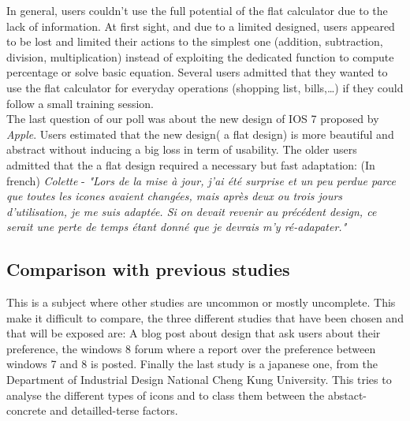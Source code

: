 \documentclass[a4paper,11pt] {article}
\theoremstyle{definition}
\begin{document}
    In general, users couldn't use the full potential of the flat calculator due to the lack of information. At first sight, and due to a limited designed, users appeared to be lost and limited their actions to the simplest one (addition, subtraction, division, multiplication) instead of exploiting the dedicated function to compute percentage or solve basic equation. Several users admitted that they wanted to use the flat calculator for everyday operations (shopping list, bills,\ldots) if they could follow a small training session.\\

    The last question of our poll was about the new design of IOS 7 proposed by \textit{Apple}.
    Users estimated that the new design( a flat design) is more beautiful and abstract without inducing a big loss in term of usability. The older users admitted that the a flat design required a necessary but fast adaptation:
  	(In french) \textit{Colette} - \textit{"Lors de la mise à jour, j'ai été surprise et un peu perdue parce que toutes les icones avaient changées, mais après deux ou trois jours d'utilisation, je me suis adaptée. Si on devait revenir au précédent design, ce serait une perte de temps étant donné que je devrais m'y ré-adapater."}

    \subsection{Comparison with previous studies}
    This is a subject where other studies are uncommon or mostly uncomplete. This make it difficult to compare, the three different studies that have been chosen and that will be exposed are: A blog post about design that ask users about their preference, the windows 8 forum where a report over the preference between windows 7 and 8 is posted. Finally the last study is a japanese one, from the Department of Industrial Design National Cheng Kung University. This tries to analyse the different types of icons and to class them between the abstact-concrete and detailled-terse factors.
\end{document}
